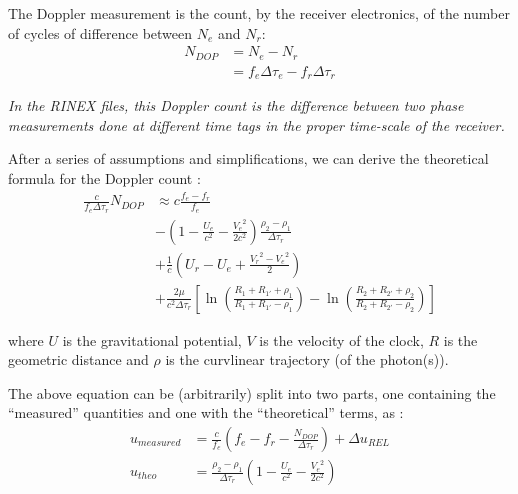 The Doppler measurement is the count, by the receiver electronics, of the number 
of cycles of difference between \(N_e\) and \(N_r\):
\begin{equation}
    \begin{split}
    N_{DOP} & = N_e - N_r\\
            & = f_e \Delta\tau_e - f_r \Delta\tau_r
    \end{split}
\end{equation}

\emph{In the RINEX files, this Doppler count is the difference between two phase measurements 
done at different time tags in the proper time-scale of the receiver.}

After a series of assumptions and simplifications, we can derive the theoretical 
formula for the Doppler count \cite{lemoine-2016}:
\begin{equation}
    \begin{split}
        \frac{c}{f_e \Delta\tau_r} N_{DOP} & \approx c \frac{f_e - f_r}{f_e} \\
        & - (1 - \frac{U_e}{c^2} - \frac{{V_e}^2}{2 c^2}) \frac{\rho_2 - \rho_1}{\Delta\tau_r}\\
        & + \frac{1}{c} (U_r - U_e + \frac{{V_r}^2 - {V_e}^2}{2}) \\
        & + \frac{2 \mu}{c^2 \Delta\tau_r} [\ln{(\frac{R_1 + R_{1'} + \rho_1}{R_1 + R_{1'} - \rho_1})} - \ln{(\frac{R_2 + R_{2'} + \rho_2}{R_2 + R_{2'} - \rho_2})}]
    \end{split}
\end{equation}

where \(U\) is the gravitational potential, \(V\) is the velocity of the clock, \(R\) 
is the geometric distance and \(\rho\) is the curvlinear trajectory (of the photon(s)).

The above equation can be (arbitrarily) split into two parts, one containing the ``measured'' 
quantities and one with the ``theoretical'' terms, as \cite{lemoine-2016}:
\begin{subequations}\label{eq:lem12}
  \begin{align}
    u_{measured} & = \frac{c}{f_e} (f_e - f_r -
     \frac{N_{DOP}}{\Delta\tau_r}) + \Delta u_{REL} \label{eq:lem12a} \\
    u_{theo}     &= \frac{\rho_2 - \rho_1}{\Delta\tau_r} (1- \frac{U_e}{c^2} - 
      \frac{{V_e}^2}{2 c^2}) \label{eq:lem12b}
  \end{align}
\end{subequations}

